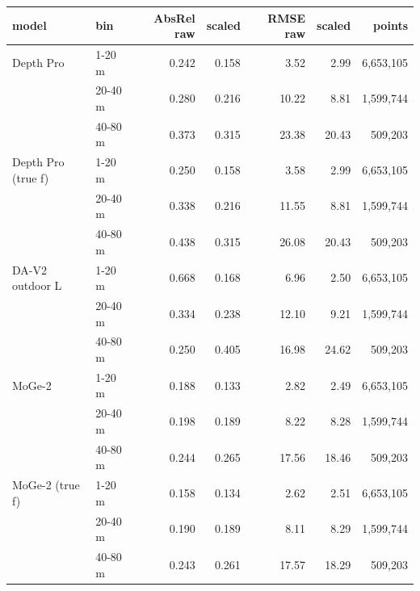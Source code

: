 \footnotesize\renewcommand{\arraystretch}{0.92}
\begin{tabular}{llrrrrr}
\toprule
model & bin & AbsRel raw & scaled & RMSE raw & scaled & points \\
\midrule
Depth Pro & 1-20 m & 0.242 & 0.158 & 3.52 & 2.99 & 6,653,105 \\
 & 20-40 m & 0.280 & 0.216 & 10.22 & 8.81 & 1,599,744 \\
 & 40-80 m & 0.373 & 0.315 & 23.38 & 20.43 & 509,203 \\
Depth Pro (true f) & 1-20 m & 0.250 & 0.158 & 3.58 & 2.99 & 6,653,105 \\
 & 20-40 m & 0.338 & 0.216 & 11.55 & 8.81 & 1,599,744 \\
 & 40-80 m & 0.438 & 0.315 & 26.08 & 20.43 & 509,203 \\
DA-V2 outdoor L & 1-20 m & 0.668 & 0.168 & 6.96 & 2.50 & 6,653,105 \\
 & 20-40 m & 0.334 & 0.238 & 12.10 & 9.21 & 1,599,744 \\
 & 40-80 m & 0.250 & 0.405 & 16.98 & 24.62 & 509,203 \\
MoGe-2 & 1-20 m & 0.188 & 0.133 & 2.82 & 2.49 & 6,653,105 \\
 & 20-40 m & 0.198 & 0.189 & 8.22 & 8.28 & 1,599,744 \\
 & 40-80 m & 0.244 & 0.265 & 17.56 & 18.46 & 509,203 \\
MoGe-2 (true f) & 1-20 m & 0.158 & 0.134 & 2.62 & 2.51 & 6,653,105 \\
 & 20-40 m & 0.190 & 0.189 & 8.11 & 8.29 & 1,599,744 \\
 & 40-80 m & 0.243 & 0.261 & 17.57 & 18.29 & 509,203 \\
\bottomrule
\end{tabular}
